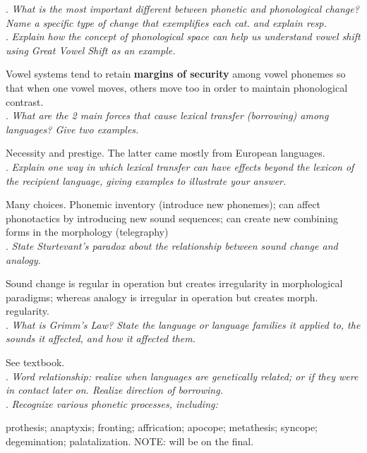 \documentclass{exam}
\begin{document}
. \textit{What is the most important different between phonetic and phonological change? Name a specific type of change that exemplifies each cat. and explain resp.} \\

. \textit{Explain how the concept of phonological space can help us understand vowel shift using Great Vowel Shift as an example.} 

\noindent Vowel systems tend to retain \textbf{margins of security} among vowel phonemes so that when one vowel moves, others move too in order to maintain phonological contrast. \\

. \textit{What are the 2 main forces that cause lexical transfer (borrowing) among languages? Give two examples.}

\noindent Necessity and prestige. The latter came mostly from European languages.\\

. \textit{Explain one way in which lexical transfer can have effects beyond the lexicon of the recipient language, giving examples to illustrate your answer. }

\noindent Many choices. Phonemic inventory (introduce new phonemes); can affect phonotactics by introducing new sound sequences;  can create new combining forms in the morphology (telegraphy) \\

. \textit{State Sturtevant's paradox about the relationship between sound change and analogy.}

\noindent Sound change is regular in operation but creates irregularity in morphological paradigms; whereas analogy is irregular in operation but creates morph. regularity. \\

.\textit{ What is Grimm's Law? State the language or language families it applied to, the sounds it affected, and how it affected them.} 

\noindent See textbook.\\

. \textit{Word relationship: realize when languages are genetically related; or if they were in contact later on. Realize direction of borrowing.} \\

. \textit{Recognize various phonetic processes, including:  }

\noindent prothesis; anaptyxis; fronting; affrication; apocope; metathesis; syncope; degemination; palatalization. NOTE: will be on the final.\\
\end{document}
